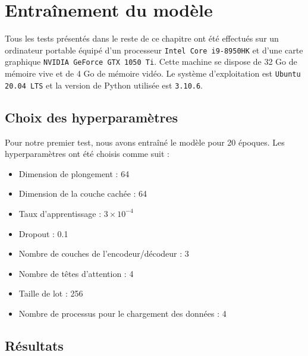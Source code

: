 \section{Entraînement du modèle}%
\label{sec.results.training}

Tous les tests présentés dans le reste de ce chapitre ont été effectués sur un ordinateur portable 
équipé d'un processeur \verb|Intel Core i9-8950HK| et d'une carte graphique \verb|NVIDIA GeForce GTX 1050 Ti|.
Cette machine se dispose de 32 Go de mémoire vive et de 4 Go de mémoire vidéo.
Le système d'exploitation est \verb|Ubuntu 20.04 LTS| et la version de Python utilisée est \verb|3.10.6|.


\subsection{Choix des hyperparamètres}%
\label{sub.results.training.hyperparameters}

Pour notre premier test, nous avons entraîné le modèle pour 20 époques.
Les hyperparamètres ont été choisis comme suit :
\begin{itemize}
    \item Dimension de plongement : 64
    \item Dimension de la couche cachée : 64
    \item Taux d'apprentissage : \(3 \times 10^{-4}\)
    \item Dropout : 0.1
    \item Nombre de couches de l'encodeur/décodeur : 3
    \item Nombre de têtes d'attention : 4
    \item Taille de lot : 256
    \item Nombre de processus pour le chargement des données : 4
\end{itemize}


\subsection{Résultats}%
\label{sub.results.training.results}

